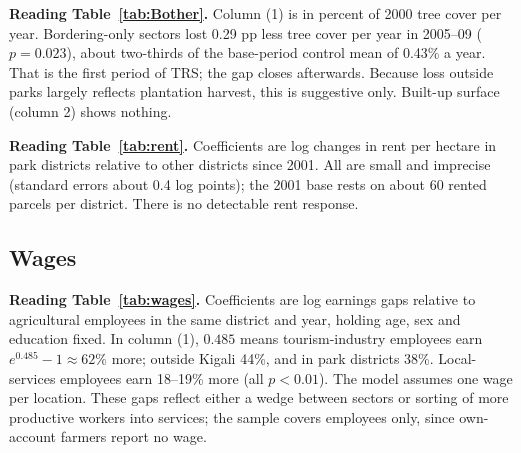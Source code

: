 \documentclass[11pt]{article}
\begin{document}

\noindent\textbf{Reading Table~\ref{tab:Bother}.} Column (1) is in percent of 2000 tree cover per year. Bordering-only sectors lost 0.29 pp less tree cover per year in 2005--09 ($p=0.023$), about two-thirds of the base-period control mean of 0.43\% a year. That is the first period of TRS; the gap closes afterwards. Because loss outside parks largely reflects plantation harvest, this is suggestive only. Built-up surface (column 2) shows nothing.


\noindent\textbf{Reading Table~\ref{tab:rent}.} Coefficients are log changes in rent per hectare in park districts relative to other districts since 2001. All are small and imprecise (standard errors about 0.4 log points); the 2001 base rests on about 60 rented parcels per district. There is no detectable rent response.

\subsection{Wages}


\noindent\textbf{Reading Table~\ref{tab:wages}.} Coefficients are log earnings gaps relative to agricultural employees in the same district and year, holding age, sex and education fixed. In column (1), $0.485$ means tourism-industry employees earn $e^{0.485}-1\approx62\%$ more; outside Kigali 44\%, and in park districts 38\%. Local-services employees earn 18--19\% more (all $p<0.01$). The model assumes one wage per location. These gaps reflect either a wedge between sectors or sorting of more productive workers into services; the sample covers employees only, since own-account farmers report no wage.
\end{document}
